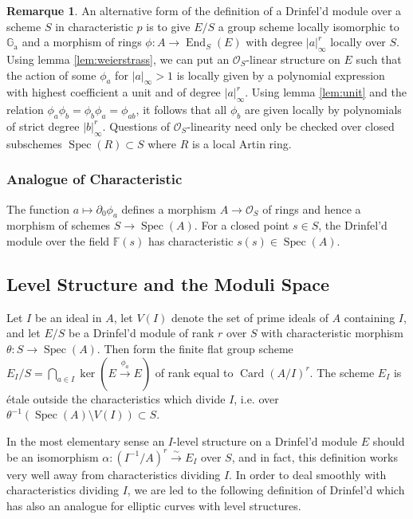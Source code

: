 \documentclass[12pt,a4paper]{article}
\theoremstyle{plain}
\theoremstyle{definition}
\newtheorem{remark}{Remarque}[section]
\theoremstyle{remark}
\DeclareMathOperator{\End}{End}
\DeclareMathOperator{\Spec}{Spec}
\DeclareMathOperator{\Card}{Card}
\newcommand{\bF}{\mathbb{F}}
\newcommand{\cO}{\mathcal{O}}
\newcommand{\Ga}{\mathbb{G}_\mathrm{a}}
\providecommand{\Ga}{\mathbb{G}_{\mathrm a}}
\providecommand{\cO}{\mathcal{O}}
\providecommand{\End}{\operatorname{End}}
\providecommand{\Spec}{\operatorname{Spec}}
\begin{document}
\begin{remark}
\label{rem:alternative}
An alternative form of the definition of a Drinfel'd module over a scheme $S$ in characteristic $p$ is to give $E/S$ a group scheme locally isomorphic to $\Ga$ and a morphism of rings $\phi: A \to \End_S(E)$ with degree $|a|_\infty^r$ locally over $S$. Using lemma \eqref{lem:weierstrass}, we can put an $\cO_S$-linear structure on $E$ such that the action of some $\phi_a$ for $|a|_\infty > 1$ is locally given by a polynomial expression with highest coefficient a unit and of degree $|a|_\infty^r$. Using lemma \eqref{lem:unit} and the relation $\phi_a \phi_b = \phi_b \phi_a = \phi_{ab}$, it follows that all $\phi_b$ are given locally by polynomials of strict degree $|b|_\infty^r$. Questions of $\cO_S$-linearity need only be checked over closed subschemes $\Spec(R) \subset S$ where $R$ is a local Artin ring.
\end{remark}

\subsubsection*{Analogue of Characteristic}

The function $a \mapsto \partial_0 \phi_a$ defines a morphism $A \to \cO_S$ of rings and hence a morphism of schemes $S \to \Spec(A)$. For a closed point $s \in S$, the Drinfel'd module over the field $\bF(s)$ has characteristic $s(s) \in \Spec(A)$.

\subsection{Level Structure and the Moduli Space}
\label{sec:level}

Let $I$ be an ideal in $A$, let $V(I)$ denote the set of prime ideals of $A$ containing $I$, and let $E/S$ be a Drinfel'd module of rank $r$ over $S$ with characteristic morphism $\theta: S \to \Spec(A)$. Then form the finite flat group scheme $E_I/S = \bigcap_{a \in I} \ker(E \xrightarrow{\phi_a} E)$ of rank equal to $\Card(A/I)^r$. The scheme $E_I$ is \'etale outside the characteristics which divide $I$, i.e. over $\theta^{-1}(\Spec(A) \setminus V(I)) \subset S$.

In the most elementary sense an $I$-level structure on a Drinfel'd module $E$ should be an isomorphism $\alpha: (I^{-1}/A)^r \xrightarrow{\sim} E_I$ over $S$, and in fact, this definition works very well away from characteristics dividing $I$. In order to deal smoothly with characteristics dividing $I$, we are led to the following definition of Drinfel'd which has also an analogue for elliptic curves with level structures.
\end{document}
